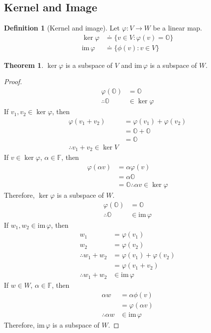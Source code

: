 \documentclass[fleqn, a4paper, 12pt]{article}
\theoremstyle{definition}
\newtheorem{definition}{Definition} %
\theoremstyle{theorem}
\newtheorem{theorem}{Theorem} %
\theoremstyle{remark}
\newcommand{\im}{\mathrm{im}\,}
\numberwithin{corollary}{theorem}
\numberwithin{equation}{theorem}
\begin{document}
\subsection{Kernel and Image}

\begin{definition}[Kernel and image]
	Let $\varphi : V \to W$ be a linear map.
	\begin{align*}
		\ker \varphi &\doteq \{v \in V : \varphi (v) = \mathbb{O}\}\\
		\im \varphi &\doteq \{\phi (v) : v \in V\}
	\end{align*}
\end{definition}

\begin{theorem}
	$\ker \varphi$ is a subspace of $V$ and $\im \varphi$ is a subspace of $W$.
\end{theorem}

\begin{proof}
	\begin{align*}
		\varphi (\mathbb{O}) &= \mathbb{O}\\
		\therefore \mathbb{O} &\in \ker \varphi
	\end{align*}
	If $v_1, v_2 \in \ker \varphi$, then
	\begin{align*}
		\varphi (v_1 + v_2) &= \varphi (v_1) + \varphi (v_2)\\
		&= \mathbb{O} + \mathbb{O}\\
		&= \mathbb{O}\\
		\therefore v_1 + v_2 \in \ker V
	\end{align*}
	If $v \in \ker \varphi$, $\alpha \in \mathbb{F}$, then
	\begin{align*}
		\varphi (\alpha v) &= \alpha \varphi (v)\\
		&= \alpha \mathbb{O} \\
		&= \mathbb{O}
		\therefore \alpha v \in \ker \varphi
	\end{align*}
	Therefore, $\ker \varphi$ is a subspace of $W$.\\
	\begin{align*}
		\varphi (\mathbb{O}) &= \mathbb{O}\\
		\therefore \mathbb{O} &\in \im \varphi
	\end{align*}
	If $w_1, w_2 \in \im \varphi$, then
	\begin{align*}
		w_1 &= \varphi (v_1)\\
		w_2 &= \varphi (v_2)\\
		\therefore w_1 + w_2 &= \varphi (v_1) + \varphi (v_2)\\
		&= \varphi (v_1 + v_2)\\
		\therefore w_1 + w_2 &\in \im \varphi
	\end{align*}
	If $w \in W$, $\alpha \in \mathbb{F}$, then
	\begin{align*}
		\alpha w &= \alpha \phi (v)\\
		&= \varphi (\alpha v)\\
		\therefore \alpha w &\in \im \varphi
	\end{align*}
	Therefore, $\im \varphi$ is a subspace of $W$.
\end{proof}
\end{document}
